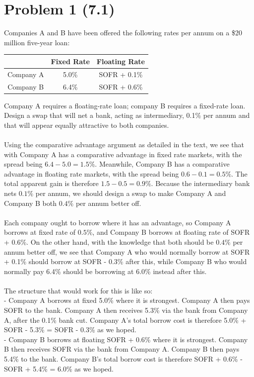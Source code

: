 \documentclass{article}
\begin{document}
\thispagestyle{firstpageheader}
{\Large 

\section*{Problem 1 (7.1)}
Companies A and B have been offered the following rates per annum on a \$20 million five-year loan:
\begin{center}
\begin{tabular}{ |c|c|c| } 
 \hline
  & Fixed Rate & Floating Rate \\ 
 \hline
 Company A & 5.0\% & SOFR + 0.1\% \\ 
 \hline
 Company B & 6.4\% & SOFR + 0.6\% \\ 
 \hline
\end{tabular}
\end{center}
Company A requires a floating-rate loan; company B requires a fixed-rate loan. Design a swap that will net a bank, acting as intermediary, 0.1\% per annum and that will appear equally attractive to both companies. \\ \\
Using the comparative advantage argument as detailed in the text, we see that with Company A has a comparative advantage in fixed rate markets, with the spread being \(6.4 - 5.0 = 1.5\%\). Meanwhile, Company B has a comparative advantage in floating rate markets, with the spread being \(0.6 - 0.1 = 0.5\%\). The total apparent gain is therefore \(1.5 - 0.5 = 0.9\%\). Because the intermediary bank nets \(0.1\%\) per annum, we should design a swap to make Company A and Company B both \(0.4\%\) per annum better off. \\ \\
Each company ought to borrow where it has an advantage, so Company A borrows at fixed rate of \(0.5\%\), and Company B borrows at floating rate of SOFR + 0.6\%. On the other hand, with the knowledge that both should be \(0.4\%\) per annum better off, we see that Company A who would normally borrow at SOFR + 0.1\% should borrow at SOFR - 0.3\% after this, while Company B who would normally pay 6.4\% should be borrowing at 6.0\% instead after this. \\ \\
The structure that would work for this is like so: \\
- Company A borrows at fixed 5.0\% where it is strongest. Company A then pays SOFR to the bank. Company A then receives 5.3\% via the bank from Company A, after the 0.1\% bank cut. Company A's total borrow cost is therefore 5.0\% + SOFR - 5.3\% = SOFR - 0.3\% as we hoped. \\
- Company B borrows at floating SOFR + 0.6\% where it is strongest. Company B then receives SOFR via the bank from Company A. Company B then pays 5.4\% to the bank. Company B's total borrow cost is therefore SOFR + 0.6\% - SOFR + 5.4\% = 6.0\% as we hoped. 

}
\end{document}
